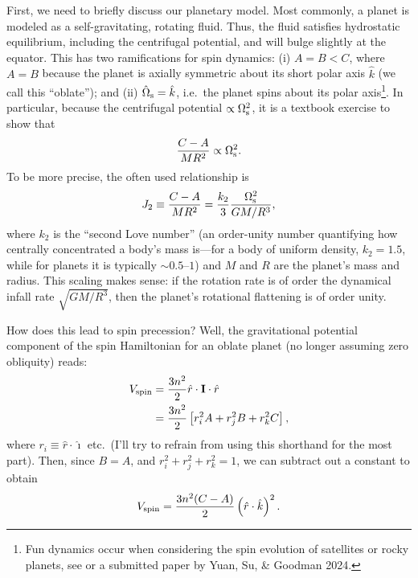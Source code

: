 \documentclass[11pt,
        usenames, %
        dvipsnames %
    ]{article}
\newcommand*{\bm}[1]{\boldsymbol{\mathbf{#1}}}
\newcommand*{\p}[1]{\left(#1\right)}
\newcommand*{\s}[1]{\left[#1\right]}
\begin{document}
First, we need to briefly discuss our planetary model. Most commonly, a planet
is modeled as a self-gravitating, rotating fluid. Thus, the fluid satisfies
hydrostatic equilibrium, including the centrifugal potential, and will bulge
slightly at the equator. This has two ramifications for spin dynamics: (i) $A =
B < C$, where $A=B$ because the planet is axially symmetric about its short
polar axis $\hat{k}$ (we call this ``oblate''); and (ii) $\hat{\Omega}_{\rm s} =
\hat{k}$, i.e.\ the planet spins about its polar axis\footnote{Fun dynamics
occur when considering the spin evolution of satellites or rocky planets, see
\citet{gladman1996synchronous} or a submitted paper by Yuan, Su, \& Goodman
2024.}. In particular, because the centrifugal potential $\propto \Omega_{\rm
s}^2$, it is a textbook exercise to show that
\begin{equation}
    \frac{C - A}{MR^2} \propto \Omega_{\rm s}^2.
\end{equation}
To be more precise, the often used relationship is
\begin{equation}
    J_2 \equiv \frac{C - A}{MR^2} = \frac{k_2}{3}\frac{\Omega_{\rm
    s}^2}{GM/R^3},
\end{equation}
where $k_2$ is the ``second Love number'' (an order-unity number quantifying how
centrally concentrated a body's mass is---for a body of uniform density, $k_2 =
1.5$, while for planets it is typically $\sim 0.5$--$1$) and $M$ and $R$ are the
planet's mass and radius. This scaling makes sense: if the rotation rate is of
order the dynamical infall rate $\sqrt{GM/R^3}$, then the planet's rotational
flattening is of order unity.

How does this lead to spin precession? Well, the gravitational potential
component of the spin Hamiltonian for an oblate planet (no longer assuming zero
obliquity) reads:
\begin{align}
    V_{\rm spin} &= \frac{3n^2}{2}\hat{r} \cdot \bm{I} \cdot \hat{r}\nonumber\\
        &= \frac{3n^2}{2}\s{r_i^2A + r_j^2B + r_k^2C},
\end{align}
where $r_i \equiv \hat{r} \cdot \hat{\imath}$ etc.\ (I'll try to refrain from
using this shorthand for the most part). Then, since $B = A$, and $r_i^2 + r_j^2
+ r_k^2 = 1$, we can subtract out a constant to obtain
\begin{equation}
    V_{\rm spin} = \frac{3n^2(C - A)}{2}\p{\hat{r} \cdot \hat{k}}^2.
\end{equation}
\end{document}
